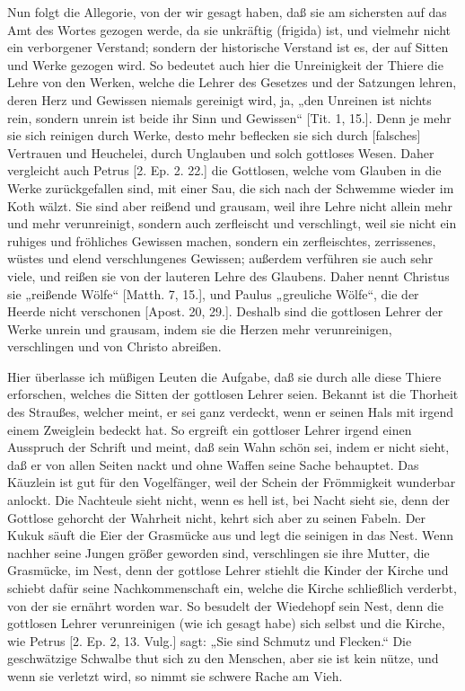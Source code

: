 Nun folgt die Allegorie, von der wir gesagt haben, daß sie am sichersten auf das Amt des Wortes gezogen werde, da sie unkräftig (frigida) ist, und vielmehr nicht ein verborgener Verstand; sondern der historische Verstand ist es, der auf Sitten und Werke gezogen wird. So bedeutet auch hier die Unreinigkeit der Thiere die Lehre von den Werken, welche die Lehrer des Gesetzes und der Satzungen lehren, deren Herz und Gewissen niemals gereinigt wird, ja, „den Unreinen ist nichts rein, sondern unrein ist beide ihr Sinn und Gewissen“ [Tit. 1, 15.]. Denn je mehr sie sich reinigen durch Werke, desto mehr
beflecken sie sich durch [falsches] Vertrauen und Heuchelei, durch Unglauben und solch gottloses Wesen. Daher vergleicht auch Petrus [2. Ep. 2. 22.] die Gottlosen, welche vom Glauben in die Werke zurückgefallen sind, mit einer Sau, die sich nach der Schwemme wieder im Koth wälzt. Sie sind aber reißend und grausam, weil ihre Lehre nicht allein mehr und mehr verunreinigt, sondern auch zerfleischt und verschlingt, weil sie nicht ein ruhiges und fröhliches Gewissen machen, sondern ein zerfleischtes, zerrissenes, wüstes und elend verschlungenes Gewissen; außerdem verführen sie auch sehr viele, und reißen sie von der lauteren Lehre des Glaubens. Daher nennt Christus sie „reißende Wölfe“ [Matth. 7, 15.], und Paulus „greuliche Wölfe“, die der Heerde nicht verschonen [Apost. 20, 29.]. Deshalb sind die gottlosen Lehrer der Werke unrein und grausam, indem sie die Herzen mehr verunreinigen, verschlingen und von Christo abreißen.

Hier überlasse ich müßigen Leuten die Aufgabe, daß sie durch alle diese Thiere erforschen, welches die Sitten der gottlosen Lehrer seien. Bekannt ist die Thorheit des Straußes, welcher meint, er sei ganz verdeckt, wenn er seinen Hals mit irgend einem Zweiglein bedeckt hat. So ergreift ein gottloser Lehrer irgend einen Ausspruch der Schrift und meint, daß sein Wahn schön sei, indem er nicht sieht, daß er von allen Seiten nackt und ohne Waffen seine Sache behauptet. Das Käuzlein ist gut für den Vogelfänger, weil der Schein der Frömmigkeit wunderbar anlockt. Die Nachteule sieht nicht, wenn es hell ist, bei Nacht sieht sie, denn der Gottlose gehorcht der Wahrheit nicht, kehrt sich aber zu seinen Fabeln. Der Kukuk säuft die Eier der Grasmücke aus und legt die seinigen in das Nest. Wenn nachher seine Jungen größer geworden sind, verschlingen sie ihre Mutter, die Grasmücke, im Nest, denn der gottlose Lehrer stiehlt die Kinder der Kirche und schiebt dafür seine Nachkommenschaft ein, welche die Kirche schließlich verderbt, von der sie ernährt worden war. So besudelt der Wiedehopf sein Nest, denn die gottlosen Lehrer verunreinigen (wie ich gesagt habe) sich selbst und die Kirche, wie Petrus [2. Ep. 2, 13. Vulg.] sagt: „Sie sind Schmutz und Flecken.“ Die geschwätzige Schwalbe thut sich zu den Menschen, aber sie ist kein nütze, und wenn sie verletzt wird, so nimmt sie schwere Rache am Vieh.

